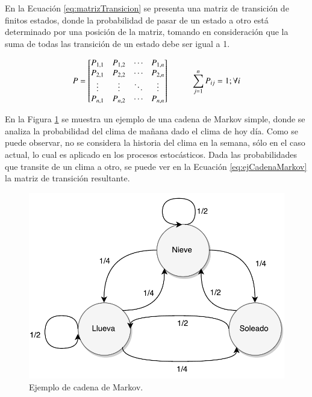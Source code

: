 En la Ecuación \ref{eq:matrizTransicion} se presenta una matriz de transición de finitos estados, donde la probabilidad de pasar de un estado a otro está determinado por una posición de la matriz, tomando en consideración que la suma de todas las transición de un estado debe ser igual a 1.

\begin{equation} \label{eq:matrizTransicion}
	P =
	\begin{bmatrix}
		P_{1,1} & P_{1,2} & \cdots & P_{1,n} \\
		P_{2,1} & P_{2,2} & \cdots & P_{2,n} \\
		\vdots  & \vdots  & \ddots & \vdots  \\
		P_{n,1} & P_{n,2} & \cdots & P_{n,n} \\
	\end{bmatrix}
	\hspace*{1cm} \sum_{j=1}^{n} P_{ij} = 1 ; \forall i
\end{equation}

En la Figura \ref{fig:ejCadenaMarkov} se muestra un ejemplo de una cadena de Markov simple, donde se analiza la probabilidad del clima de mañana dado el clima de hoy día. Como se puede observar, no se considera la historia del clima en la semana, sólo en el caso actual, lo cual es aplicado en los procesos estocásticos. Dada las probabilidades que transite de un clima a otro, se puede ver en la Ecuación \ref{eq:ejCadenaMarkov} la matriz de transición resultante.

\begin{figure}
	\centering
	\includegraphics[scale=0.5]{images/EjCadenaMarkov.pdf}
	\caption{Ejemplo de cadena de Markov.}
	\label{fig:ejCadenaMarkov}
\end{figure}

